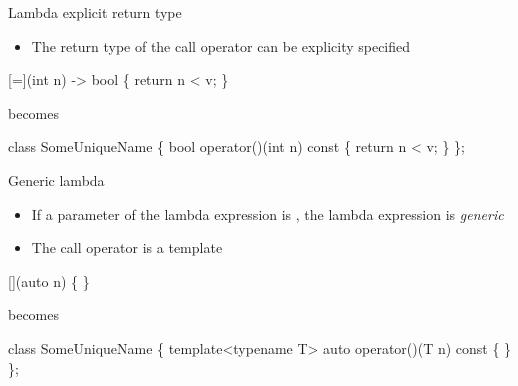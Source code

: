 \begin{frame}[fragile]{Lambda explicit return type}

  \begin{itemize}
  \item The return type of the call operator can be explicity specified
  \end{itemize}
    
  \begin{codeblock}{
[=](int n) -> \alert{bool} \{ return n < v; \}
}\end{codeblock}

  becomes

  \begin{codeblock}{
class SomeUniqueName \{
  \ddd
  \alert{bool} operator()(int n) const
  \{ return n < v; \}
\};
}\end{codeblock}

\end{frame}

\begin{frame}[fragile]{Generic lambda}

  \begin{itemize}
  \item If a parameter of the lambda expression is , the lambda expression is \textit{generic}
  \item The call operator is a template
  \end{itemize}

  \begin{codeblock}{
[](\alert{auto} n) \{ \ddd \}
}\end{codeblock}

  becomes

  \begin{codeblock}{
class SomeUniqueName \{
  \ddd
  \alert{template<typename T>}
  auto operator()(\alert{T} n) const \{ \ddd \}
\};
}\end{codeblock}

\end{frame}

